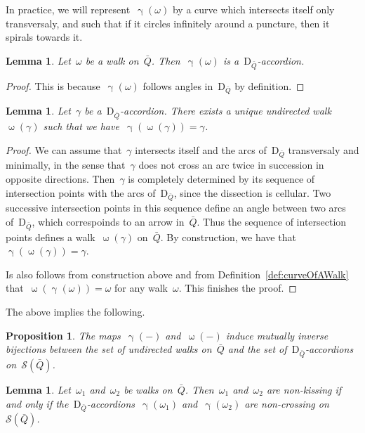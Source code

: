 \documentclass{amsart}
\newtheorem{proposition}[theorem]{Proposition}
\newtheorem{lemma}[theorem]{Lemma}
\theoremstyle{definition}
\newcommand{\walk}{\operatorname{\omega}} %
\newcommand{\surface}{\mathcal{S}} %
\newcommand{\dissection}{\mathrm{D}} %
\newcommand{\curveof}{\operatorname{\gamma}} %
\begin{document}
In practice, we will represent~$\curveof(\omega)$ by a curve which intersects itself only transversaly, and such that if it circles infinitely around a puncture, then it spirals towards it.

\begin{lemma}
\label{lemm:curveOfAWalkIsAccordion}
Let~$\omega$ be a walk on~$\bar Q$.  Then~$\curveof(\omega)$ is a~$\dissection_{\bar Q}$-accordion.
\end{lemma}

\begin{proof}
This is because~$\curveof(\omega)$ follows angles in~$\dissection_{\bar Q}$ by definition.
\end{proof}

\begin{lemma}
\label{lemm:accordionsAreCurvesOfWalks}
Let~$\gamma$ be a~$\dissection_{\bar Q}$-accordion.  There exists a unique undirected walk~$\walk(\gamma)$ such that we have~$\curveof(\walk(\gamma)) = \gamma$.
\end{lemma}
\begin{proof}
We can assume that~$\gamma$ intersects itself and the arcs of~$\dissection_{\bar Q}$ transversaly and minimally, in the sense that~$\gamma$ does not cross an arc twice in succession in opposite directions.
Then~$\gamma$ is completely determined by its sequence of intersection points with the arcs of~$\dissection_{\bar Q}$, since the dissection is cellular.
Two successive intersection points in this sequence define an angle between two arcs of~$\dissection_{\bar Q}$, which correspoinds to an arrow in~$\bar Q$.
Thus the sequence of intersection points defines a walk~$\walk(\gamma)$ on~$\bar Q$.
By construction, we have that~$\curveof(\walk(\gamma)) = \gamma$.

Is also follows from construction above and from Definition~\ref{def:curveOfAWalk} that~$\walk(\curveof(\omega)) = \omega$ for any walk~$\omega$.
This finishes the proof.
\end{proof}

The above implies the following.

\begin{proposition}
\label{prop:walks=arcs}
The maps~$\curveof(-)$ and~$\walk(-)$ induce mutually inverse bijections between the set of undirected walks on~$\bar Q$ and the set of~$\dissection_{\bar Q}$-accordions on~$\surface(\bar Q)$.
\end{proposition}

\begin{lemma}
\label{lem:nonKissing=nonCrossing}
Let~$\omega_1$ and~$\omega_2$ be walks on~$\bar Q$.  Then~$\omega_1$ and~$\omega_2$ are non-kissing if and only if the~$\dissection_{\bar Q}$-accordions~$\curveof(\omega_1)$ and~$\curveof(\omega_2)$ are non-crossing on~$\surface(\bar Q)$.
\end{lemma}
\end{document}
